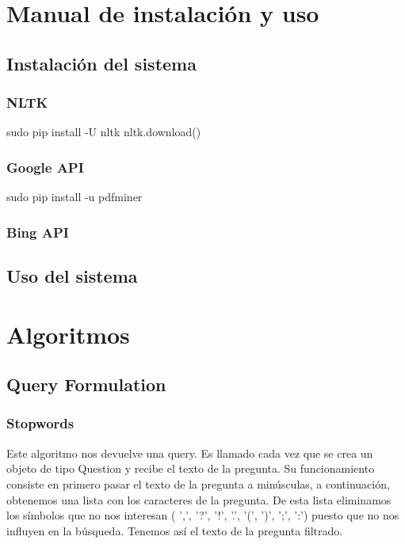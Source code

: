 \documentclass[12pt,a4paper,titlepage]{article}
\begin{document}
\clearpage
\section{Manual de instalación y uso}

\subsection{Instalación del sistema}

\subsubsection{NLTK}
sudo pip install -U nltk
nltk.download()

\subsubsection{Google API}

sudo pip install -u pdfminer

\subsubsection{Bing API}



\subsection{Uso del sistema}



\clearpage
\section{Algoritmos}
\subsection{Query Formulation}
\subsubsection{Stopwords}
Este algoritmo nos devuelve una query. Es llamado cada vez que se crea un objeto de tipo Question y recibe el texto de la pregunta. Su funcionamiento consiste en primero pasar el texto de la pregunta a minúsculas, a continuación, obtenemos una lista con los caracteres de la pregunta. De esta lista eliminamos los símbolos que no nos interesan ( ',', '?', '!', '.', '(', ')', ';', ':') puesto que no nos influyen en la búsqueda. Tenemos así el texto de la pregunta filtrado.
\end{document}
